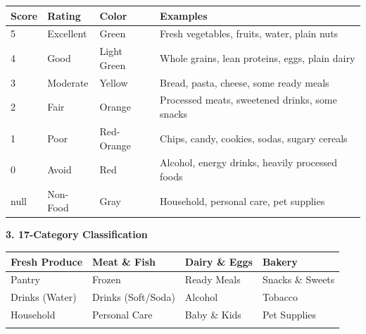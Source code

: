 \documentclass[11pt,a4paper]{report}
\begin{document}
\begin{center}
\renewcommand{\arraystretch}{1.3}
\begin{tabular}{>{\centering\arraybackslash}p{1.5cm} >{\raggedright\arraybackslash}p{2.5cm} >{\centering\arraybackslash}p{2.5cm} >{\raggedright\arraybackslash}p{6cm}}
\toprule
\rowcolor{miloprimary!15}
\textbf{Score} & \textbf{Rating} & \textbf{Color} & \textbf{Examples} \\
\midrule
\cellcolor{successgreen!30}5 & Excellent & Green & Fresh vegetables, fruits, water, plain nuts \\
\cellcolor{successgreen!15}4 & Good & Light Green & Whole grains, lean proteins, eggs, plain dairy \\
\cellcolor{warningorange!15}3 & Moderate & Yellow & Bread, pasta, cheese, some ready meals \\
\cellcolor{warningorange!30}2 & Fair & Orange & Processed meats, sweetened drinks, some snacks \\
\cellcolor{dangerred!15}1 & Poor & Red-Orange & Chips, candy, cookies, sodas, sugary cereals \\
\cellcolor{dangerred!30}0 & Avoid & Red & Alcohol, energy drinks, heavily processed foods \\
\cellcolor{freegray!15}null & Non-Food & Gray & Household, personal care, pet supplies \\
\bottomrule
\end{tabular}
\end{center}

\textbf{3. 17-Category Classification}

\begin{center}
\renewcommand{\arraystretch}{1.2}
\small
\begin{tabular}{>{\raggedright\arraybackslash}p{3.5cm} >{\raggedright\arraybackslash}p{3.5cm} >{\raggedright\arraybackslash}p{3.5cm} >{\raggedright\arraybackslash}p{3.5cm}}
\toprule
Fresh Produce & Meat \& Fish & Dairy \& Eggs & Bakery \\
\midrule
Pantry & Frozen & Ready Meals & Snacks \& Sweets \\
\midrule
Drinks (Water) & Drinks (Soft/Soda) & Alcohol & Tobacco \\
\midrule
Household & Personal Care & Baby \& Kids & Pet Supplies \\
\midrule
\multicolumn{4}{c}{Other (uncategorized)} \\
\bottomrule
\end{tabular}
\end{center}
\end{document}

